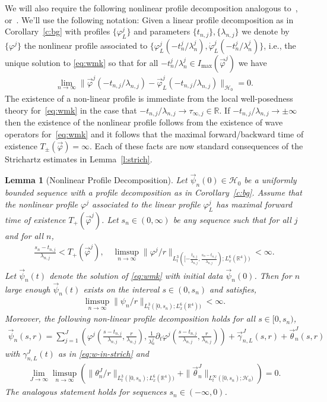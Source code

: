\documentclass[10pt,reqno]{amsart}
\newcommand{\HH}{\mathcal{H}}
\newcommand{\R}{\mathbb{R}}
\newcommand{\ga}{\gamma}
\newcommand{\fy}{\varphi}
\newcommand{\la}{\lambda}
\newcommand{\te}{\theta}
\newcommand{\p}{\partial}
\newcommand{\EQ}[1]{\begin{equation}\begin{split} #1 \end{split}\end{equation}}
\numberwithin{equation}{section}
\newtheorem{lem}[thm]{Lemma}
\theoremstyle{remark}
\newcommand{\0}{\emptyset}
\begin{document}
 We will also require the following nonlinear profile decomposition analogous to~\cite[Proposition 2.17]{CKLS1}, or~\cite[Proposition 2.8]{DKM1}. We'll use the following notation: Given a linear profile decomposition as in Corollary~\ref{c:bg} with profiles $\{\fy^j_L\}$ and parameters $\{t_{n,j}\}, \{ \la_{n, j}\}$ we denote by $\{\fy^j\}$ the nonlinear profile associated to $\{\fy^j_L(-t_n^j/ \la_n^j), \dot{\fy}^j_L(-t_n^j/ \la_n^j)\}$, i.e., the unique solution to \eqref{eq:wmk} so that for all $-t_n^j/ \la_n^j \in I_{\max}(\vec \fy^j)$ we have
\EQ{
\lim_{n \to \infty} \| \vec \fy^j(-t_{n, j}/\la_{n, j}) - \vec \fy_L^j(-t_{n, j}/ \la_{n,j})\|_{\HH_0} =0.
}
The existence of a non-linear profile is immediate from the local well-posedness theory for~\eqref{eq:wmk} in the case that $-t_{n, j}/ \la_{n,j} \to \tau_{\infty, j} \in \R$. If $-t_{n, j}/ \la_{n, j}  \to \pm \infty$ then the existence of the nonlinear profile follows from the existence of wave operators for~\eqref{eq:wmk} and it follows that the maximal forward/backward time of existence  $T_{\pm}(\vec \fy) = \infty$. Each of these facts are now standard consequences of the Strichartz estimates in Lemma~\ref{l:strich}. 

\begin{lem}[Nonlinear Profile Decomposition]\emph{\cite[Proposition 2.17]{CKLS1}\cite[Proposition 2.8]{DKM1}\cite{BG}}\label{p:nlprof} Let $\vec \psi_n(0) \in \HH_0$ be a uniformly bounded sequence with a profile decomposition as in Corollary~\ref{c:bg}. Assume that the nonlinear profile $\fy^j$ associated to the linear profile $\fy^j_L$ has maximal forward time of existence $T_+(\vec \fy^j)$. Let $s_n \in (0, \infty)$ be any sequence such that for all $j$ and for all $n$, 
\EQ{
\frac{s_n - t_{n, j}}{\la_{n, j}} < T_+(\vec \fy^j), \quad \limsup_{n \to \infty} \|\fy^j/ r\|_{L^3_t([-\frac{t_{n, j}}{\la_{n, j}}, \frac{s_n - t_{n, j}}{\la_{n, j}}); L^6_x(\R^4))} <\infty.
}
Let $\vec \psi_n(t)$ denote the solution of \eqref{eq:wmk} with initial data $\vec \psi_n(0)$.  Then for $n$ large enough  $\vec \psi_n(t)$ exists on the interval $s \in (0, s_n)$ and satisfies, 
\EQ{
\limsup_{n \to \infty} \|\psi_n/r\|_{L^3_t([0, s_n); L^6_x(\R^4))} < \infty.
}
Moreover, the following non-linear profile decomposition holds for all $s \in [0, s_n)$,  
\EQ{
\vec \psi_n(s, r) = \sum_{j=1}^J \left(\fy^j\left( \frac{s- t_{n, j}}{\la_{n, j}}, \frac{r}{\la_{n, j}}\right), \frac{1}{\la_n^j}\p_t \fy^j\left(\frac{s-t_{n, j}}{\la_{n, j}}, \frac{r}{\la_{n,j}}\right) \right) + \vec \ga_{n, L}^{J}(s, r)+ \vec \te_n^J(s, r)
}
with  $\ga_{n, L}^J(t)$ as in \eqref{eq:w-in-strich} and 
\EQ{\label{eq:nlerror}
\lim_{J \to \infty} \limsup_{n\to \infty} \left( \|\te_n^J/r\|_{L^3_t([0, s_n); L^6_x(\R^4))} + \|\vec \te_n^J\|_{L^{\infty}_t ([0, s_n); \HH_0)} \right) =0.
}
The analogous statement holds for sequences $s_n\in (-\infty, 0)$. 
\end{lem}
 
\end{document}
